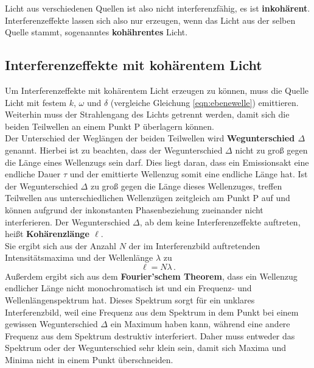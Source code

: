 Licht aus verschiedenen Quellen ist also nicht interferenzfähig, es ist \textbf{inkohärent}.
Interferenzeffekte lassen sich also nur erzeugen, wenn das Licht aus der selben Quelle stammt,
sogenanntes \textbf{kohährentes} Licht.


\subsection{Interferenzeffekte mit kohärentem Licht}
\label{sec:kohärenz}

Um Interferenzeffekte mit kohärentem Licht erzeugen zu können, muss die Quelle Licht mit
festem $k$, $\omega$ und $\delta$ (vergleiche Gleichung \eqref{eqn:ebenewelle}) emittieren.\\
Weiterhin muss der Strahlengang des Lichts getrennt werden, damit sich die beiden Teilwellen
an einem Punkt P überlagern können.\\
Der Unterschied der Weglängen der beiden Teilwellen wird \textbf{Wegunterschied $\Delta$}
genannt.
Hierbei ist zu beachten, dass der Wegunterschied $\Delta$ nicht zu groß gegen die Länge eines
Wellenzugs sein darf. Dies liegt daran, dass ein Emissionsakt eine endliche Dauer $\tau$ und der
emittierte Wellenzug somit eine endliche Länge hat. Ist der Wegunterschied $\Delta$ zu groß
gegen die Länge dieses Wellenzuges, treffen Teilwellen aus unterschiedlichen Wellenzügen
zeitgleich am Punkt P auf und können aufgrund der inkonstanten Phasenbeziehung zueinander nicht
interferieren.
Der Wegunterschied $\Delta$, ab dem keine Interferenzeffekte auftreten, heißt \textbf{Kohärenzlänge $\ell$}.\\ Sie ergibt sich aus der Anzahl $N$ der im Interferenzbild
auftretenden Intensitätsmaxima und der Wellenlänge $\lambda$ zu
\begin{equation}
	\ell = N \lambda \, \mathrm{.}
\end{equation}
Außerdem ergibt sich aus dem \textbf{Fourier'schem Theorem}, dass ein Wellenzug endlicher
Länge nicht monochromatisch ist und ein Frequenz- und Wellenlängenspektrum hat. Dieses
Spektrum sorgt für ein unklares Interferenzbild, weil eine Frequenz aus dem Spektrum in dem
Punkt bei einem gewissen Wegunterschied $\Delta$ ein Maximum haben kann, während eine andere
Frequenz aus dem Spektrum destruktiv interferiert. Daher muss entweder das Spektrum oder der
Wegunterschied sehr klein sein, damit sich Maxima und Minima nicht in einem Punkt überschneiden.


